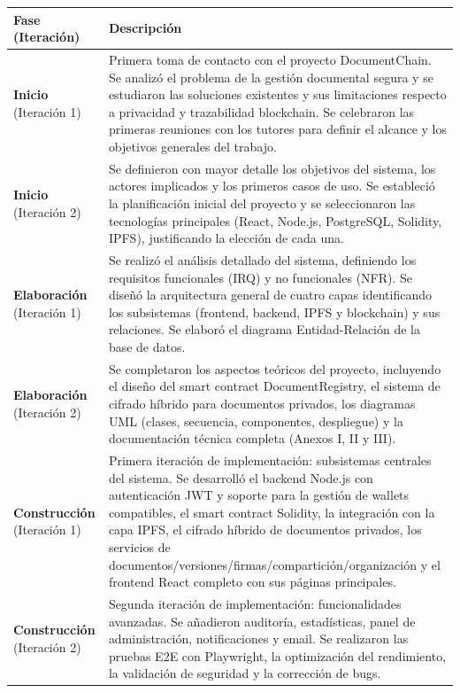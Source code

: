 \documentclass[11pt, a4paper]{article}
\begin{document}
\begin{table}[H]
\centering
\begin{tabular}{|p{4cm}|p{10cm}|}
\hline
\textbf{Fase (Iteración)} & \textbf{Descripción} \\
\hline
\textbf{Inicio} (Iteración 1) &
Primera toma de contacto con el proyecto DocumentChain. Se analizó el problema de la gestión documental segura y se estudiaron las soluciones existentes y sus limitaciones respecto a privacidad y trazabilidad blockchain. Se celebraron las primeras reuniones con los tutores para definir el alcance y los objetivos generales del trabajo. \\
\hline
\textbf{Inicio} (Iteración 2) &
Se definieron con mayor detalle los objetivos del sistema, los actores implicados y los primeros casos de uso. Se estableció la planificación inicial del proyecto y se seleccionaron las tecnologías principales (React, Node.js, PostgreSQL, Solidity, IPFS), justificando la elección de cada una. \\
\hline
\textbf{Elaboración} (Iteración 1) &
Se realizó el análisis detallado del sistema, definiendo los requisitos funcionales (IRQ) y no funcionales (NFR). Se diseñó la arquitectura general de cuatro capas identificando los subsistemas (frontend, backend, IPFS y blockchain) y sus relaciones. Se elaboró el diagrama Entidad-Relación de la base de datos. \\
\hline
\textbf{Elaboración} (Iteración 2) &
Se completaron los aspectos teóricos del proyecto, incluyendo el diseño del smart contract DocumentRegistry, el sistema de cifrado híbrido para documentos privados, los diagramas UML (clases, secuencia, componentes, despliegue) y la documentación técnica completa (Anexos I, II y III). \\
\hline
\textbf{Construcción} (Iteración 1) &
Primera iteración de implementación: subsistemas centrales del sistema. Se desarrolló el backend Node.js con autenticación JWT y soporte para la gestión de wallets compatibles, el smart contract Solidity, la integración con la capa IPFS, el cifrado híbrido de documentos privados, los servicios de documentos/versiones/firmas/compartición/organización y el frontend React completo con sus páginas principales. \\
\hline
\textbf{Construcción} (Iteración 2) &
Segunda iteración de implementación: funcionalidades avanzadas. Se añadieron auditoría, estadísticas, panel de administración, notificaciones y email. Se realizaron las pruebas E2E con Playwright, la optimización del rendimiento, la validación de seguridad y la corrección de bugs. \\

\end{tabular}
\end{table}
\end{document}
